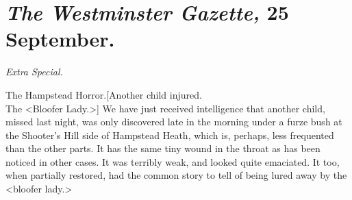 \section{\emph{The Westminster Gazette,} 25 September.}
\centerline{\textit{Extra Special.}}

\begin{newspaper}{The Hampstead Horror.}[Another child injured.\\The <Bloofer Lady.>]
We have just received intelligence that another child, missed last night, was only discovered late in the morning under a furze bush at the Shooter's Hill side of Hampstead Heath, which is, perhaps, less frequented than the other parts. It has the same tiny wound in the throat as has been noticed in other cases. It was terribly weak, and looked quite emaciated. It too, when partially restored, had the common story to tell of being lured away by the <bloofer lady.>
\end{newspaper}